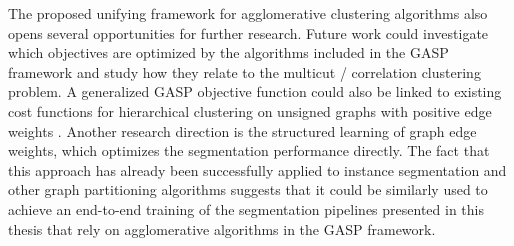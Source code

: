 The proposed unifying framework for agglomerative clustering algorithms also opens several opportunities for further research. Future work could investigate which objectives are optimized by the algorithms included in the GASP framework and study how they relate to the multicut / correlation clustering problem. A generalized GASP objective function could also be linked to existing cost functions for hierarchical clustering on unsigned graphs with positive edge weights \cite{moseley2017approximation,cohen2019hierarchical,dasgupta2016cost}. 
Another research direction is the structured learning of graph edge weights, which optimizes the segmentation performance directly. The fact that this approach has already been successfully applied to instance segmentation and other graph partitioning algorithms \cite{funke2018large,kong2018recurrentPix,wolf2017learned,cerrone2019end} suggests that it could be similarly used to achieve an end-to-end training of the segmentation pipelines presented in this thesis that rely on agglomerative algorithms in the GASP framework.

